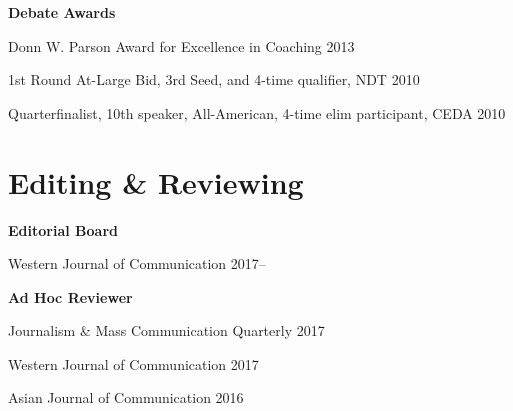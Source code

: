 \documentclass[11pt,letterpaper]{article}
\begin{document}
\textbf{Debate Awards}
\begin{innerlist}
\item Donn W. Parson Award for Excellence in Coaching \hfill 2013
\item 1st Round At-Large Bid, 3rd Seed, and 4-time qualifier, NDT \hfill 2010
\item Quarterfinalist, 10th speaker, All-American, 4-time elim participant, CEDA \hfill 2010
\end{innerlist}
\vspace{-.075in}

\section{Editing \& Reviewing}
\textbf{Editorial Board}
\begin{innerlist}
  \item Western Journal of Communication \hfill 2017--
  \item[]
\end{innerlist}
\vspace{-.075in}

\textbf{Ad Hoc Reviewer}
\begin{innerlist}
  \item Journalism \& Mass Communication Quarterly \hfill 2017
  \item Western Journal of Communication \hfill 2017
  \item Asian Journal of Communication \hfill 2016
\end{innerlist}
\vspace{-.075in}
\end{document}
